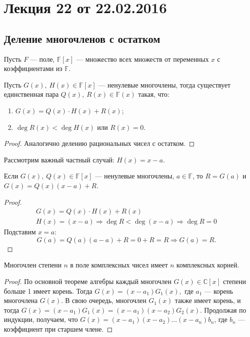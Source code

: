 



\section{Лекция 22 от 22.02.2016}

\subsection*{Деление многочленов с остатком}

Пусть $F$ --- поле, $\mathbb{F}[x]$ --- множество всех множеств от переменных $x$ с коэффициентами из $\mathbb{F}$.
\begin{Theorem}
	Пусть $G(x),\ H(x) \in \mathbb{F}[x]$ --- ненулевые многочлены, тогда существует единственная пара $Q(x),\ R(x) \in \mathbb{F}(x)$ такая, что:
	\begin{enumerate}
		\item $G(x) = Q(x)\cdot H(x) + R(x)$;
		\item $\deg  R(x) < \deg  H(x)$ или $R(x) = 0$.
	\end{enumerate}
\end{Theorem}

\begin{proof}
Аналогично делению рациональных чисел с остатком.
\end{proof}

Рассмотрим важный частный случай: $H(x) = x - a$. 

\begin{Theorem}[Безу]
	Если $G(x),\ Q(x) \in \mathbb{F}[x]$ --- ненулевые многочлены, $a \in \mathbb{F}$, то $R = G(a)$ и $G(x) = Q(x)(x - a) + R$.
\end{Theorem}

\begin{proof}
\begin{gather*}
	G(x) = Q(x)\cdot H(x) + R(x) \\
	H(x) = (x - a) \Rightarrow \deg R < \deg (x - a) \Rightarrow \deg R = 0
\end{gather*}
	Подставим $x = a$:
	$$G(a) = Q(a)(a-a) + R = 0 + R = R \Rightarrow G(a) = R.$$
\end{proof}

\begin{Theorem}
	Многочлен степени $n$ в поле комплексных чисел имеет $n$ комплексных корней.
\end{Theorem}

\begin{proof}
	По основной теореме алгебры каждый многочлен $G(x) \in \mathbb{C}[x]$ степени больше 1 имеет корень. Тогда $G(x) = (x - a_1)G_1(x),$ где $a_1$ --- корень многочлена $G(x)$. В свою очередь, многочлен $G_1(x)$ также имеет корень, и тогда $G(x) = (x - a_1)G_1(x) = (x - a_1)(x - a_2)G_2(x)$. Продолжая по индукции, получаем, что $G(x) = (x - a_1)(x - a_2)\ldots(x - a_n)b_n$, где $b_n$ --- коэффициент при старшем члене.
\end{proof}

